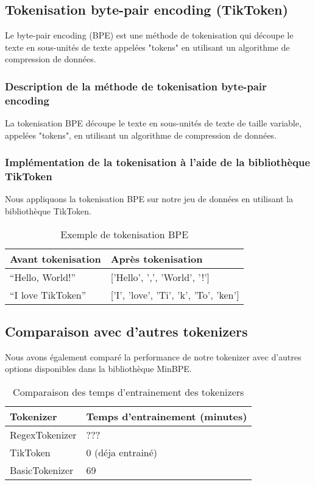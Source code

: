 \subsection{Tokenisation byte-pair encoding (TikToken)}

Le byte-pair encoding (BPE) est une méthode de tokenisation qui découpe le texte en sous-unités de texte appelées "tokens" en utilisant un algorithme de compression de données.

\subsubsection*{Description de la méthode de tokenisation byte-pair encoding}

La tokenisation BPE découpe le texte en sous-unités de texte de taille variable, appelées "tokens", en utilisant un algorithme de compression de données.

\subsubsection*{Implémentation de la tokenisation à l'aide de la bibliothèque TikToken}

Nous appliquons la tokenisation BPE sur notre jeu de données en utilisant la bibliothèque TikToken.

\begin{table}[h]
\centering
\begin{tabular}{|l|l|}
\hline
\textbf{Avant tokenisation} & \textbf{Après tokenisation} \\ \hline
``Hello, World!'' & ['Hello', ',', 'World', '!'] \\ \hline
``I love TikToken'' & ['I', 'love', 'Ti', 'k', 'To', 'ken'] \\ \hline
\end{tabular}
\caption{Exemple de tokenisation BPE}
\end{table}

\subsection{Comparaison avec d'autres tokenizers}

Nous avons également comparé la performance de notre tokenizer avec d'autres options disponibles dans la bibliothèque MinBPE.

\begin{table}[h]
\centering
\begin{tabular}{|l|l|}
\hline
\textbf{Tokenizer} & \textbf{Temps d'entrainement (minutes)} \\ \hline
RegexTokenizer & ??? \\ \hline
TikToken & 0 (déja entrainé) \\ \hline
BasicTokenizer & 69 \\ \hline
\end{tabular}
\caption{Comparaison des temps d'entrainement des tokenizers}
\end{table}


